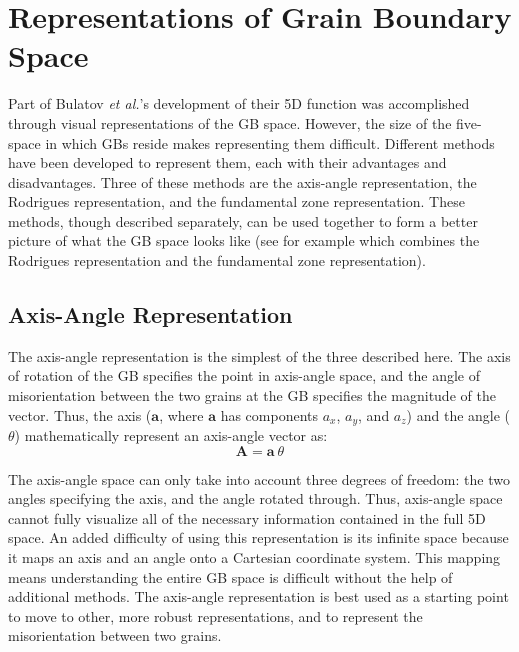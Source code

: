 \documentclass[twoside,senior]{BYUPhys}
\begin{document}
\section{Representations of Grain Boundary Space\label{methods:GBReps}}
Part of Bulatov \emph{et al.}'s development of their 5D function was accomplished through visual representations of the GB space.  However, the size of the five-space in which GBs reside makes representing them difficult.  Different methods have been developed to represent them, each with their advantages and disadvantages.  Three of these methods are the axis-angle representation, the Rodrigues representation, and the fundamental zone representation.  These methods, though described separately, can be used together to form a better picture of what the GB space looks like (see for example  which combines the Rodrigues representation and the fundamental zone representation).

\subsection{Axis-Angle Representation\label{GBReps:AA}}
The axis-angle representation is the simplest of the three described here.  The axis of rotation of the GB specifies the point in axis-angle space, and the angle of misorientation between the two grains at the GB specifies the magnitude of the vector.  Thus, the axis ($\bm{a}$, where $\bm{a}$ has components $a_x$, $a_y$, and $a_z$) and the angle ($\theta$) mathematically represent an axis-angle vector as:
\begin{equation}
\bm{A} = \bm{a}\ \theta
\label{eq:aaVec}
\end{equation} 

The axis-angle space can only take into account three degrees of freedom: the two angles specifying the axis, and the angle rotated through.  Thus, axis-angle space cannot fully visualize all of the necessary information contained in the full 5D space.\cite{frank1988} An added difficulty of using this representation is its infinite space because it maps an axis and an angle onto a Cartesian coordinate system.  This mapping means understanding the entire GB space is difficult without the help of additional methods.  The axis-angle representation is best used as a starting point to move to other, more robust representations, and to represent the misorientation between two grains.\cite{randle2000}
\end{document}
